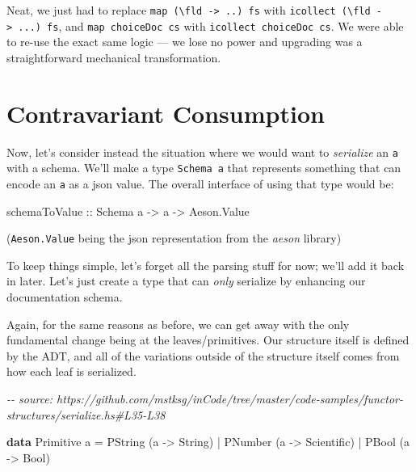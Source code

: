 \documentclass[]{article}
\newenvironment{Shaded}{}{}
\newcommand{\CommentTok}[1]{\textcolor[rgb]{0.38,0.63,0.69}{\textit{#1}}}
\newcommand{\DataTypeTok}[1]{\textcolor[rgb]{0.56,0.13,0.00}{#1}}
\newcommand{\KeywordTok}[1]{\textcolor[rgb]{0.00,0.44,0.13}{\textbf{#1}}}
\newcommand{\NormalTok}[1]{#1}
\newcommand{\OperatorTok}[1]{\textcolor[rgb]{0.40,0.40,0.40}{#1}}
\newcommand{\OtherTok}[1]{\textcolor[rgb]{0.00,0.44,0.13}{#1}}
\begin{document}
Neat, we just had to replace
\texttt{map\ (\textbackslash{}fld\ -\textgreater{}\ ..)\ fs} with
\texttt{icollect\ (\textbackslash{}fld\ -\textgreater{}\ ...)\ fs}, and
\texttt{map\ choiceDoc\ cs} with \texttt{icollect\ choiceDoc\ cs}. We were able
to re-use the exact same logic --- we lose no power and upgrading was a
straightforward mechanical transformation.

\hypertarget{contravariant-consumption}{%
\section{Contravariant Consumption}\label{contravariant-consumption}}

Now, let's consider instead the situation where we would want to
\emph{serialize} an \texttt{a} with a schema. We'll make a type
\texttt{Schema\ a} that represents something that can encode an \texttt{a} as a
json value. The overall interface of using that type would be:

\begin{Shaded}
\begin{Highlighting}[]
\OtherTok{schemaToValue ::} \DataTypeTok{Schema}\NormalTok{ a }\OtherTok{{-}>}\NormalTok{ a }\OtherTok{{-}>} \DataTypeTok{Aeson.Value}
\end{Highlighting}
\end{Shaded}

(\texttt{Aeson.Value} being the json representation from the \emph{aeson}
library)

To keep things simple, let's forget all the parsing stuff for now; we'll add it
back in later. Let's just create a type that can \emph{only} serialize by
enhancing our documentation schema.

Again, for the same reasons as before, we can get away with the only fundamental
change being at the leaves/primitives. Our structure itself is defined by the
ADT, and all of the variations outside of the structure itself comes from how
each leaf is serialized.

\begin{Shaded}
\begin{Highlighting}[]
\CommentTok{{-}{-} source: https://github.com/mstksg/inCode/tree/master/code{-}samples/functor{-}structures/serialize.hs\#L35{-}L38}

\KeywordTok{data} \DataTypeTok{Primitive}\NormalTok{ a }\OtherTok{=}
      \DataTypeTok{PString}\NormalTok{ (a }\OtherTok{{-}>} \DataTypeTok{String}\NormalTok{)}
    \OperatorTok{|} \DataTypeTok{PNumber}\NormalTok{ (a }\OtherTok{{-}>} \DataTypeTok{Scientific}\NormalTok{)}
    \OperatorTok{|} \DataTypeTok{PBool}\NormalTok{   (a }\OtherTok{{-}>} \DataTypeTok{Bool}\NormalTok{)}
\end{Highlighting}
\end{Shaded}
\end{document}
